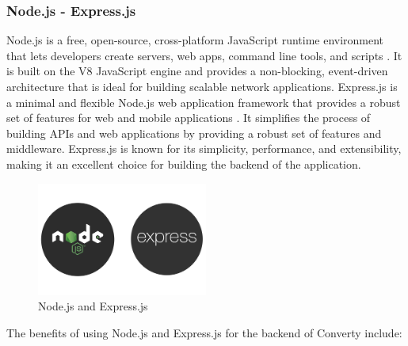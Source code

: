 \subsubsection{Node.js - Express.js}
Node.js is a free, open-source, cross-platform JavaScript runtime environment that lets developers create servers, web apps, command line tools, and scripts \cite{nodejs}. It is built on the V8 JavaScript engine and provides a non-blocking, event-driven architecture that is ideal for building scalable network applications. Express.js is a minimal and flexible Node.js web application framework that provides a robust set of features for web and mobile applications \cite{expressjs}. It simplifies the process of building APIs and web applications by providing a robust set of features and middleware. Express.js is known for its simplicity, performance, and extensibility, making it an excellent choice for building the backend of the application.

\begin{figure}[H]
    \centering
    \includegraphics[width=0.5\textwidth]{Images/nodeAndExpress.png}
    \caption{Node.js and Express.js}
    \label{fig:nodeAndExpress}
\end{figure}

The benefits of using Node.js and Express.js for the backend of Converty include:

